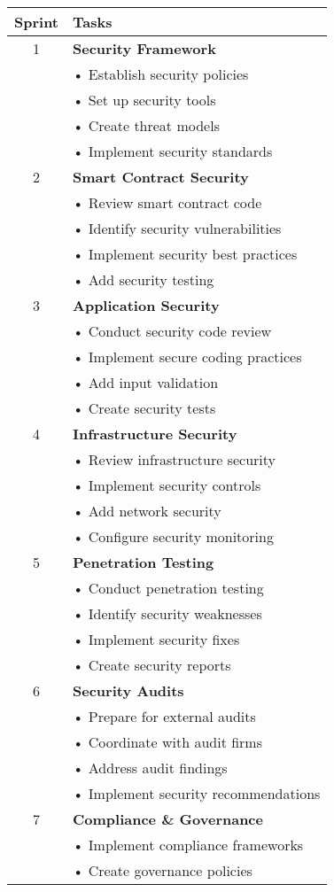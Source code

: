 \documentclass{article}
\begin{document}
\begin{longtable}{|c|p{}|}
\hline
\textbf{Sprint} & \textbf{Tasks} \\
\hline
1 & \textbf{Security Framework}\\
& • Establish security policies\\
& • Set up security tools\\
& • Create threat models\\
& • Implement security standards\\
\hline
2 & \textbf{Smart Contract Security}\\
& • Review smart contract code\\
& • Identify security vulnerabilities\\
& • Implement security best practices\\
& • Add security testing\\
\hline
3 & \textbf{Application Security}\\
& • Conduct security code review\\
& • Implement secure coding practices\\
& • Add input validation\\
& • Create security tests\\
\hline
4 & \textbf{Infrastructure Security}\\
& • Review infrastructure security\\
& • Implement security controls\\
& • Add network security\\
& • Configure security monitoring\\
\hline
5 & \textbf{Penetration Testing}\\
& • Conduct penetration testing\\
& • Identify security weaknesses\\
& • Implement security fixes\\
& • Create security reports\\
\hline
6 & \textbf{Security Audits}\\
& • Prepare for external audits\\
& • Coordinate with audit firms\\
& • Address audit findings\\
& • Implement security recommendations\\
\hline
7 & \textbf{Compliance \& Governance}\\
& • Implement compliance frameworks\\
& • Create governance policies\\

\end{longtable}
\end{document}
